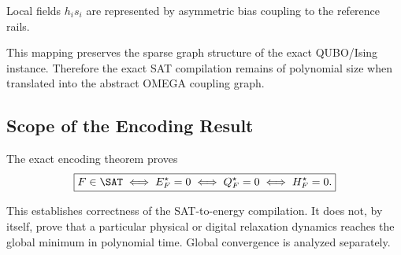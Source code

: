 Local fields $h_is_i$ are represented by asymmetric bias coupling to the
reference rails.

This mapping preserves the sparse graph structure of the exact QUBO/Ising
instance. Therefore the exact SAT compilation remains of polynomial size when
translated into the abstract OMEGA coupling graph.

\subsection{Scope of the Encoding Result}

The exact encoding theorem proves
\begin{equation}
\boxed{
F\in\SAT
\iff
E_F^\star=0
\iff
Q_F^\star=0
\iff
H_F^\star=0.
}
\end{equation}

This establishes correctness of the SAT-to-energy compilation. It does not, by
itself, prove that a particular physical or digital relaxation dynamics reaches
the global minimum in polynomial time. Global convergence is analyzed
separately.

